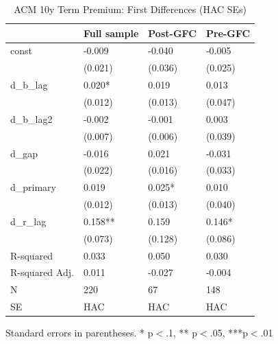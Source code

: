 \begin{table}
\caption{ACM 10y Term Premium: First Differences (HAC SEs)}
\label{tab:r_estimation_results}
\begin{center}
\begin{tabular}{llll}
\hline
               & Full sample & Post-GFC & Pre-GFC  \\
\hline
const          & -0.009      & -0.040   & -0.005   \\
               & (0.021)     & (0.036)  & (0.025)  \\
d\_b\_lag      & 0.020*      & 0.019    & 0.013    \\
               & (0.012)     & (0.013)  & (0.047)  \\
d\_b\_lag2     & -0.002      & -0.001   & 0.003    \\
               & (0.007)     & (0.006)  & (0.039)  \\
d\_gap         & -0.016      & 0.021    & -0.031   \\
               & (0.022)     & (0.016)  & (0.033)  \\
d\_primary     & 0.019       & 0.025*   & 0.010    \\
               & (0.012)     & (0.013)  & (0.040)  \\
d\_r\_lag      & 0.158**     & 0.159    & 0.146*   \\
               & (0.073)     & (0.128)  & (0.086)  \\
R-squared      & 0.033       & 0.050    & 0.030    \\
R-squared Adj. & 0.011       & -0.027   & -0.004   \\
N              & 220         & 67       & 148      \\
SE             & HAC         & HAC      & HAC      \\
\hline
\end{tabular}
\end{center}
\end{table}
\bigskip
Standard errors in parentheses. \newline 
* p$<$.1, ** p$<$.05, ***p$<$.01